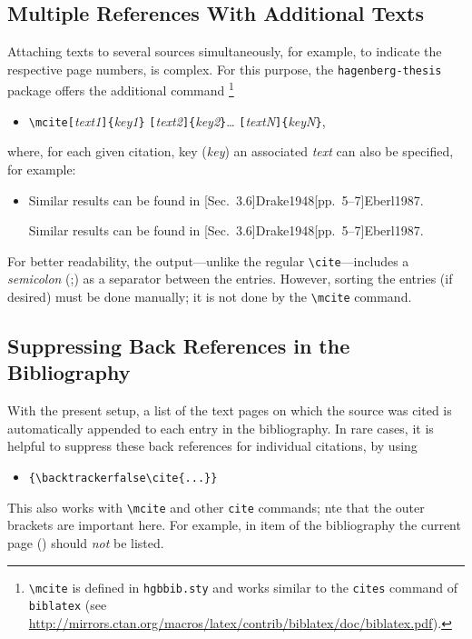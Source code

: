 \subsection{Multiple References With Additional Texts}

Attaching texts to several sources simultaneously, for example, to indicate the
respective page numbers, is complex. For this purpose, the
\texttt{hagenberg-thesis} package offers the additional command%
\footnote{\texttt{\textbackslash mcite} is defined in \texttt{hgbbib.sty} and
works similar to the \texttt{{\bs}cites} command of \texttt{biblatex}
(see \url{http://mirrors.ctan.org/macros/latex/contrib/biblatex/doc/biblatex.pdf}).}
%
\begin{itemize}
\item[]
\verb!\mcite[!\textit{text1}\verb!]{!\textit{key1}\verb!}!%
      \verb![!\textit{text2}\verb!]{!\textit{key2}\verb!}!\ldots%
			\verb![!\textit{textN}\verb!]{!\textit{keyN}\verb!}!,
\end{itemize}
%
where, for each given citation, key (\textit{key}) an associated \textit{text} can
also be specified, for example:
%
\begin{itemize}
    \item Similar results can be found in 
    [Sec.~3.6]{Drake1948}[pp.~5--7]{Eberl1987}.
\begin{LaTeXCode}[numbers=none]
Similar results can be found in 
[Sec.~3.6]{Drake1948}[pp.~5--7]{Eberl1987}.
\end{LaTeXCode}
\end{itemize}
%
For better readability, the output---unlike the regular
\texttt{\textbackslash cite}---includes a \emph{semicolon} (;) as a separator
between the entries. However, sorting the entries (if desired) must be done
manually; it is not done by the \texttt{\textbackslash mcite} command.


\subsection{Suppressing Back References in the Bibliography}

With the present setup, a list of the text pages on which the source was cited
is automatically appended to each entry in the bibliography. In rare cases, it
is helpful to suppress these back references for individual citations, by using
%
\begin{itemize}
    \item[] \verb!{\backtrackerfalse\cite{...}}!
\end{itemize}
%
This also works with \verb!\mcite! and other \verb!cite! commands; nte that 
the outer brackets are important here. For example, in item
{\backtrackerfalse\parencite{Bezos2023}} of the bibliography 
the current page (\the\value{page}) should \emph{not} be listed.

